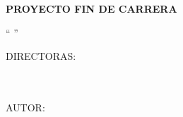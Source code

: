 {\begin{titlepage}
\begin{center}
        \Large\textrm{\textbf{PROYECTO FIN DE CARRERA}}\\
        \vspace{2cm}

        \Large\textrm{\textquotedblleft
                      \MakeUppercase{\TituloPFC}\textquotedblright}\\
        \vspace{2cm}

        \Large\textrm{DIRECTORAS:}\\
	\Large\textrm{\DirectorPFC}\\
	\Large\textrm{\CoDirectorPFC}\\
	\vspace{1.5cm}

	\Large\textrm{AUTOR:\\ \AutorPFC}\\
	\vspace{0.5cm}
	
	\end{center}
	\begin{flushright}
		\large\textrm{\Convocatoria}
	\end{flushright}

        \pagestyle{empty}
	\cleardoublepage
    
    \end{titlepage}
    
  \mbox{}
  \newpage
}
